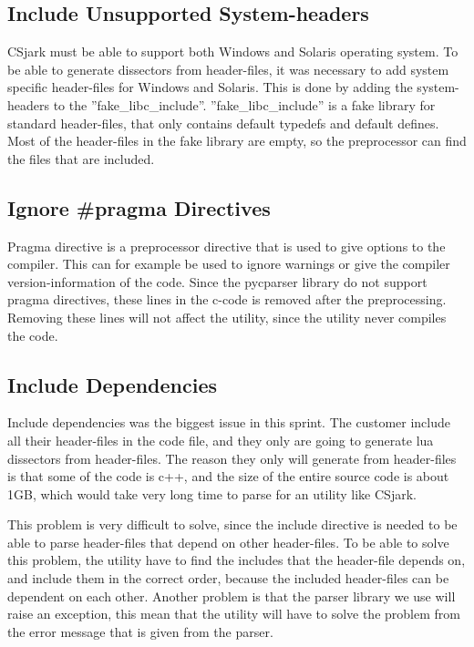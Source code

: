\subsection{Include Unsupported System-\glspl{header}}
CSjark must be able to support both Windows and Solaris operating system. To 
be able to generate dissectors from header-files, it was necessary to add 
system specific header-files for Windows and Solaris. This is done by adding 
the system-headers to the ''fake\_libc\_include''. ''fake\_libc\_include'' is 
a fake library for standard header-files, that only contains default typedefs 
and default defines. Most of the header-files in the fake library are empty, 
so the preprocessor can find the files that are included.

\subsection{Ignore \#pragma Directives}
Pragma directive is a \gls{preprocessor} directive that is used to give options to 
the compiler. This can for example be used to ignore warnings or give the 
compiler version-information of the code. Since the pycparser \gls{library} do not 
support pragma directives, these lines in the \Gls{c}-code is removed after the 
preprocessing. Removing these lines will not affect the \gls{utility}, since the 
\gls{utility} never compiles the code.

\subsection{Include Dependencies}
Include dependencies was the biggest issue in this sprint. The customer 
include all their \gls{header}-files in the code file, and they only are going to 
generate \Gls{lua} \glspl{dissector} from \gls{header}-files. The reason they only will generate 
from \gls{header}-files is that some of the code is \gls{c++}, and the size of the entire 
source code is about 1GB, which would take very long time to parse for an 
\gls{utility} like CSjark. 

This problem is very difficult to solve, since the include directive is needed 
to be able to parse \gls{header}-files that depend on other \gls{header}-files. To be able 
to solve this problem, the \gls{utility} have to find the includes that the 
\gls{header}-file depends on, and include them in the correct order, because the 
included \gls{header}-files can be dependent on each other. Another problem is 
that the parser library we use will raise an exception, this mean that the 
utility will have to solve the problem from the error message that is given 
from the parser.

